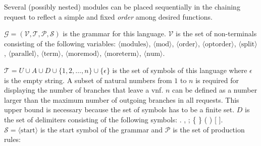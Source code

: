 \documentclass[10pt,a4paper,conference]{IEEEtran}
\begin{document}
Several (possibly nested) modules can be placed sequentially in the chaining request
to reflect a simple and fixed \emph{order} among desired functions.
 
$ \mathcal{G} {=} (\mathcal{V},\mathcal{T},\mathcal{P},\mathcal{S}) $ is the grammar
for this language. 
$ \mathcal{V} $ is the set of non-terminals consisting of the following variables:
$ \langle\text{modules}\rangle $, $ \langle\text{mod}\rangle $,
$ \langle\text{order}\rangle $, $ \langle\text{optorder}\rangle $, $ \langle\text{split}\rangle $,
$\langle\text{parallel}\rangle $, $ \langle\text{term}\rangle $, $ \langle\text{moremod}\rangle $,
$ \langle\text{moreterm}\rangle $, $ \langle\text{num}\rangle $.

$ \mathcal{T} {=}  U {\cup} A {\cup} D {\cup} \{1,2,\dotsc,n\} {\cup} \{\epsilon\} $ is the
set of symbols of this language where $ \epsilon $ is the empty string. 
A subset of natural numbers from $ 1 $ to $ n $ is 
required for displaying the number of branches that leave a \ac{vnf}. $ n $ can be
defined as a number larger than the maximum number of outgoing branches in all requests. 
This upper bound is necessary because the set of symbols has 
to be a finite set. $ D $ is the set of delimiters consisting of the following symbols:
. , ; \{ \} ( ) [  ]. $ \mathcal{S} {=} \langle\text{start}\rangle $ is the start 
symbol of the grammar and $ \mathcal{P} $ is the set of production rules:
\end{document}
